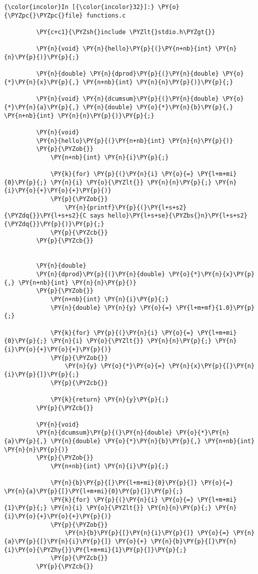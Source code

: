     \begin{Verbatim}[commandchars=\\\{\}]
{\color{incolor}In [{\color{incolor}32}]:} \PY{o}{\PYZpc{}\PYZpc{}file} functions.c
         
         \PY{c+c1}{\PYZsh{}include \PYZlt{}stdio.h\PYZgt{}}
         
         \PY{n}{void} \PY{n}{hello}\PY{p}{(}\PY{n+nb}{int} \PY{n}{n}\PY{p}{)}\PY{p}{;}
         
         \PY{n}{double} \PY{n}{dprod}\PY{p}{(}\PY{n}{double} \PY{o}{*}\PY{n}{x}\PY{p}{,} \PY{n+nb}{int} \PY{n}{n}\PY{p}{)}\PY{p}{;}
         
         \PY{n}{void} \PY{n}{dcumsum}\PY{p}{(}\PY{n}{double} \PY{o}{*}\PY{n}{a}\PY{p}{,} \PY{n}{double} \PY{o}{*}\PY{n}{b}\PY{p}{,} \PY{n+nb}{int} \PY{n}{n}\PY{p}{)}\PY{p}{;}
         
         \PY{n}{void}
         \PY{n}{hello}\PY{p}{(}\PY{n+nb}{int} \PY{n}{n}\PY{p}{)}
         \PY{p}{\PYZob{}}
             \PY{n+nb}{int} \PY{n}{i}\PY{p}{;}
             
             \PY{k}{for} \PY{p}{(}\PY{n}{i} \PY{o}{=} \PY{l+m+mi}{0}\PY{p}{;} \PY{n}{i} \PY{o}{\PYZlt{}} \PY{n}{n}\PY{p}{;} \PY{n}{i}\PY{o}{+}\PY{o}{+}\PY{p}{)}
             \PY{p}{\PYZob{}}
                 \PY{n}{printf}\PY{p}{(}\PY{l+s+s2}{\PYZdq{}}\PY{l+s+s2}{C says hello}\PY{l+s+se}{\PYZbs{}n}\PY{l+s+s2}{\PYZdq{}}\PY{p}{)}\PY{p}{;}
             \PY{p}{\PYZcb{}}
         \PY{p}{\PYZcb{}}
         
         
         \PY{n}{double} 
         \PY{n}{dprod}\PY{p}{(}\PY{n}{double} \PY{o}{*}\PY{n}{x}\PY{p}{,} \PY{n+nb}{int} \PY{n}{n}\PY{p}{)}
         \PY{p}{\PYZob{}}
             \PY{n+nb}{int} \PY{n}{i}\PY{p}{;}
             \PY{n}{double} \PY{n}{y} \PY{o}{=} \PY{l+m+mf}{1.0}\PY{p}{;}
             
             \PY{k}{for} \PY{p}{(}\PY{n}{i} \PY{o}{=} \PY{l+m+mi}{0}\PY{p}{;} \PY{n}{i} \PY{o}{\PYZlt{}} \PY{n}{n}\PY{p}{;} \PY{n}{i}\PY{o}{+}\PY{o}{+}\PY{p}{)}
             \PY{p}{\PYZob{}}
                 \PY{n}{y} \PY{o}{*}\PY{o}{=} \PY{n}{x}\PY{p}{[}\PY{n}{i}\PY{p}{]}\PY{p}{;}
             \PY{p}{\PYZcb{}}
         
             \PY{k}{return} \PY{n}{y}\PY{p}{;}
         \PY{p}{\PYZcb{}}
         
         \PY{n}{void}
         \PY{n}{dcumsum}\PY{p}{(}\PY{n}{double} \PY{o}{*}\PY{n}{a}\PY{p}{,} \PY{n}{double} \PY{o}{*}\PY{n}{b}\PY{p}{,} \PY{n+nb}{int} \PY{n}{n}\PY{p}{)}
         \PY{p}{\PYZob{}}
             \PY{n+nb}{int} \PY{n}{i}\PY{p}{;}
             
             \PY{n}{b}\PY{p}{[}\PY{l+m+mi}{0}\PY{p}{]} \PY{o}{=} \PY{n}{a}\PY{p}{[}\PY{l+m+mi}{0}\PY{p}{]}\PY{p}{;}
             \PY{k}{for} \PY{p}{(}\PY{n}{i} \PY{o}{=} \PY{l+m+mi}{1}\PY{p}{;} \PY{n}{i} \PY{o}{\PYZlt{}} \PY{n}{n}\PY{p}{;} \PY{n}{i}\PY{o}{+}\PY{o}{+}\PY{p}{)}
             \PY{p}{\PYZob{}}
                 \PY{n}{b}\PY{p}{[}\PY{n}{i}\PY{p}{]} \PY{o}{=} \PY{n}{a}\PY{p}{[}\PY{n}{i}\PY{p}{]} \PY{o}{+} \PY{n}{b}\PY{p}{[}\PY{n}{i}\PY{o}{\PYZhy{}}\PY{l+m+mi}{1}\PY{p}{]}\PY{p}{;}
             \PY{p}{\PYZcb{}}
         \PY{p}{\PYZcb{}}
\end{Verbatim}

